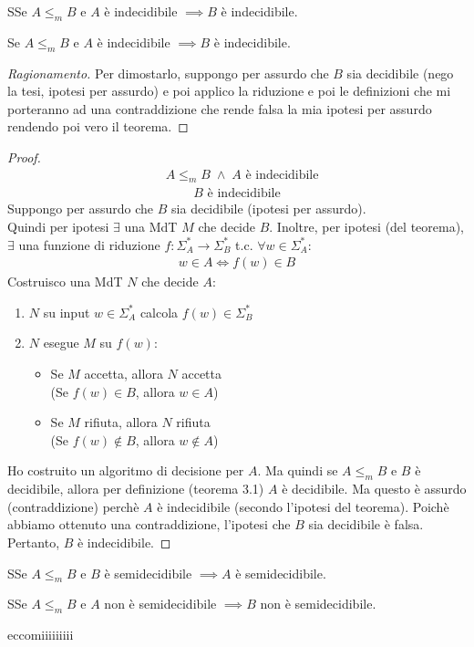 \documentclass{article}  %
\theoremstyle{definition}
\newenvironment{ragionamento}[1][]
  {\begin{proof}[Ragionamento#1]\renewcommand{\qedsymbol}{}\normalfont}
  {\end{proof}}
\begin{document}
\begin{theorem}{3.2}
  SSe $A \leq_m B$ e $A$ è indecidibile $\implies B$ è indecidibile. 
\end{theorem}
\begin{esercizio}[Dimostrazione 3.2]
    \footnotesize %
    Se $A \leq_m B$ e $A$ è indecidibile $\implies B$ è indecidibile.
    \begin{ragionamento}
      Per dimostarlo, suppongo per assurdo che $B$ sia decidibile (nego la tesi, ipotesi per assurdo) e poi applico
      la riduzione e poi le definizioni che mi porteranno ad una contraddizione che rende falsa la mia ipotesi per assurdo
      rendendo poi vero il teorema.
    \end{ragionamento}
    \begin{proof}
        \begin{align*}
        & A \leq_m B \;\wedge\; A \text{ è indecidibile} \tag*{(ipotesi)}
      \end{align*}
      \begin{align*}
        B \text{ è indecidibile} \tag*{(tesi)}
      \end{align*}
      Suppongo per assurdo che $B$ sia decidibile (ipotesi per assurdo). \\
      Quindi per ipotesi $\exists$ una MdT $M$ che decide $B$. Inoltre, per ipotesi (del teorema), $\exists$ una funzione
      di riduzione $f: \Sigma^*_A \rightarrow \Sigma^*_B$ t.c. $\forall{w} \in \Sigma^*_A$:
      \begin{align*}
        w \in A \iff f(w) \in B
      \end{align*}
      Costruisco una MdT $N$ che decide $A$:
      \begin{enumerate}
        \item $N$ su input $w \in \Sigma^*_A$ calcola $f(w) \in \Sigma^*_B$
        \item $N$ esegue $M$ su $f(w)$:
        \begin{itemize}
          \item Se $M$ accetta, allora $N$ accetta \\ 
          (Se $f(w) \in B$, allora $w \in A$)
          \item Se $M$ rifiuta, allora $N$ rifiuta \\
          (Se $f(w) \notin B$, allora $w \notin A$)
        \end{itemize}
      \end{enumerate}
      Ho costruito un algoritmo di decisione per $A$. Ma quindi se $A \leq_m B$ e $B$ è decidibile, allora per definizione
      (teorema 3.1) $A$ è decidibile. Ma questo è assurdo (contraddizione) perchè $A$ è indecidibile (secondo l'ipotesi del teorema). 
      Poichè abbiamo ottenuto una contraddizione, l'ipotesi che $B$ sia decidibile è falsa. Pertanto, $B$ è indecidibile.
    \end{proof}
\end{esercizio}


\begin{theorem}{3.3}
  SSe $A \leq_m B$ e $B$ è semidecidibile $\implies A$ è semidecidibile. 
\end{theorem}
\begin{theorem}{3.4}
  SSe $A \leq_m B$ e $A$ non è semidecidibile $\implies B$ non è semidecidibile. 
\end{theorem}

eccomiiiiiiiii
\end{document}
